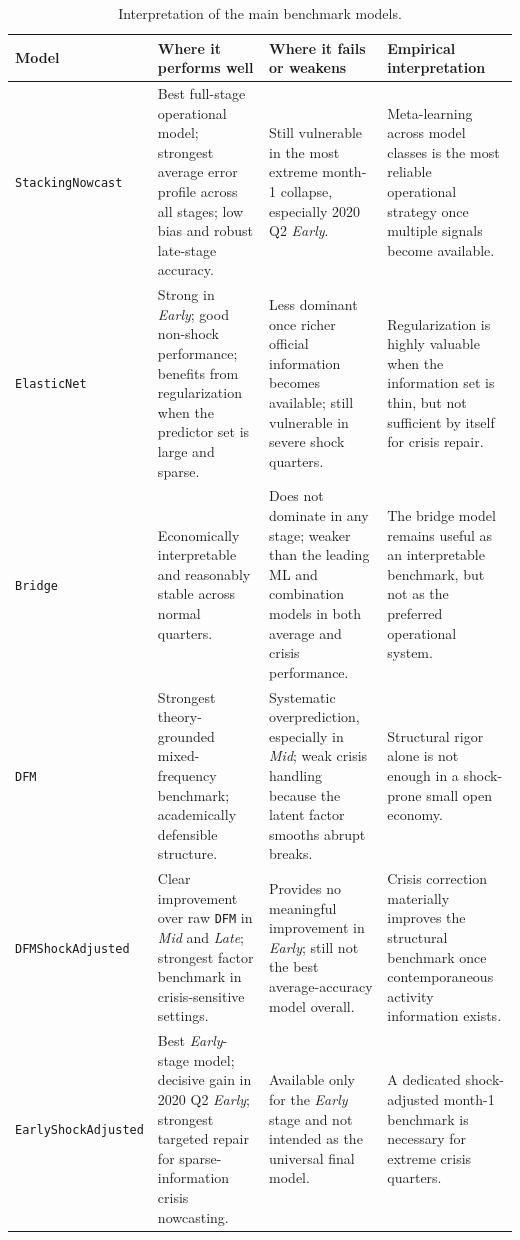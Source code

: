 \documentclass[12pt,a4paper]{report}
\begin{document}
\begin{table}[H]
    \centering
    \footnotesize
    \caption{Interpretation of the main benchmark models.}
    \label{tab:model_interpretation_detail}
    \begin{tabularx}{\textwidth}{>{\raggedright\arraybackslash}p{3.9cm}YYY}
        \toprule
        Model & Where it performs well & Where it fails or weakens & Empirical interpretation \\
        \midrule
        \texttt{StackingNowcast} & Best full-stage operational model; strongest average error profile across all stages; low bias and robust late-stage accuracy. & Still vulnerable in the most extreme month-1 collapse, especially 2020 Q2 \textit{Early}. & Meta-learning across model classes is the most reliable operational strategy once multiple signals become available. \\
        \texttt{ElasticNet} & Strong in \textit{Early}; good non-shock performance; benefits from regularization when the predictor set is large and sparse. & Less dominant once richer official information becomes available; still vulnerable in severe shock quarters. & Regularization is highly valuable when the information set is thin, but not sufficient by itself for crisis repair. \\
        \texttt{Bridge} & Economically interpretable and reasonably stable across normal quarters. & Does not dominate in any stage; weaker than the leading ML and combination models in both average and crisis performance. & The bridge model remains useful as an interpretable benchmark, but not as the preferred operational system. \\
        \texttt{DFM} & Strongest theory-grounded mixed-frequency benchmark; academically defensible structure. & Systematic overprediction, especially in \textit{Mid}; weak crisis handling because the latent factor smooths abrupt breaks. & Structural rigor alone is not enough in a shock-prone small open economy. \\
        \texttt{DFMShockAdjusted} & Clear improvement over raw \texttt{DFM} in \textit{Mid} and \textit{Late}; strongest factor benchmark in crisis-sensitive settings. & Provides no meaningful improvement in \textit{Early}; still not the best average-accuracy model overall. & Crisis correction materially improves the structural benchmark once contemporaneous activity information exists. \\
        \texttt{EarlyShockAdjusted} & Best \textit{Early}-stage model; decisive gain in 2020 Q2 \textit{Early}; strongest targeted repair for sparse-information crisis nowcasting. & Available only for the \textit{Early} stage and not intended as the universal final model. & A dedicated shock-adjusted month-1 benchmark is necessary for extreme crisis quarters. \\

\end{tabularx}
\end{table}
\end{document}
